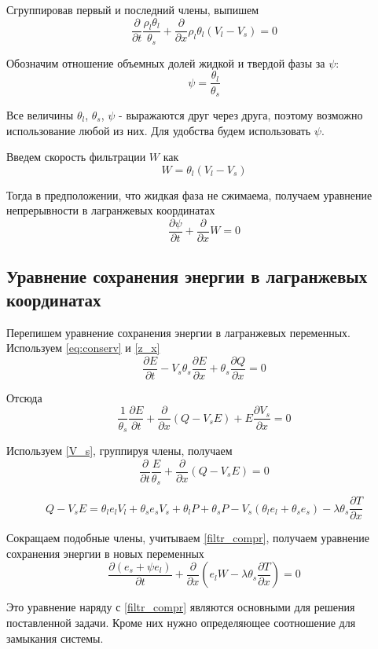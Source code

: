 \documentclass[12pt,a4paper]{article}
\newcommand{\pd}[2]{\frac{\partial #1}{\partial #2}}
\begin{document}
Сгруппировав первый и последний члены, выпишем
\begin{equation}
\pd{}{t}\frac{\rho_l\theta_l}{\theta_s} + \pd{}{x}\rho_l\theta_l(V_l - V_s) = 0
\label{filtr_compr_1}
\end{equation}

Обозначим отношение объемных долей жидкой и твердой фазы за $\psi $: 
$$
\psi = \frac{\theta_l}{\theta_s} 
$$

Все величины $\theta_l $, $\theta_s $, $\psi $ - выражаются друг через друга, поэтому возможно использование любой из них. Для удобства будем использовать $\psi$.

Введем скорость фильтрации $W$ как
\begin{equation}
W = \theta_l (V_l - V_s )
\label{W_filtr}
\end{equation}

Тогда в предположении, что жидкая фаза не сжимаема, получаем уравнение непрерывности в лагранжевых координатах
\begin{equation}
\pd{\psi}{t} + \pd{}{x}W = 0
\label{filtr_compr}
\end{equation}

\subsection{Уравнение сохранения энергии в лагранжевых координатах}
Перепишем уравнение сохранения энергии в лагранжевых переменных. Используем \eqref{eq:conserv} и \eqref{z_x}
$$
\pd{E}{t} - V_s\theta_s\pd{E}{x} + \theta_s\pd{Q}{x} = 0
$$

Отсюда
$$
\frac{1}{\theta_s}\pd{E}{t} + \pd{}{x}(Q-V_s E) + E\pd{V_s}{x} = 0
$$

Используем \eqref{V_s}, группируя члены, получаем
\begin{equation}
\pd{}{t}\frac{E}{\theta_s} + \pd{}{x}(Q - V_s E) = 0
\end{equation}

$$
Q-V_s E = \theta_l e_l V_l + \theta_s e_s V_s + \theta_l P + \theta_s P -V_s(\theta_l e_l +\theta_s e_s) - \lambda\theta_s\pd{T}{x}
$$

Сокращаем подобные члены, учитываем \eqref{filtr_compr}, получаем уравнение сохранения энергии в новых переменных
\begin{equation}
\pd{(e_s + \psi e_l)}{t} + \pd{}{x}(e_l W - \lambda\theta_s\pd{T}{x}) = 0
\label{eq:conserv_new}
\end{equation}

Это уравнение наряду с \eqref{filtr_compr} являются основными для решения поставленной задачи. Кроме них нужно определяющее соотношение для замыкания системы.
\end{document}
